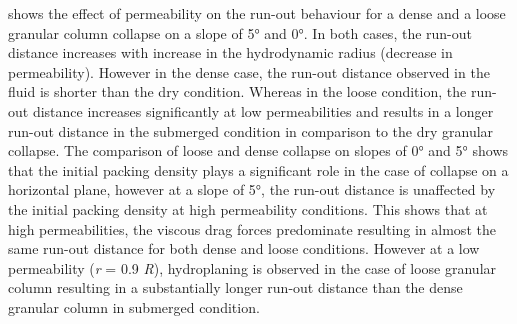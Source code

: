 \documentclass[12pt,twoside]{tuhhproc-en}
\begin{document}
 shows the effect of permeability on the 
run-out behaviour for a dense and a loose granular column collapse on a slope 
of 5\si{\degree} and 0\si{\degree}. In both cases, the run-out distance 
increases with increase in the hydrodynamic radius (decrease in permeability). 
However in the dense case, the run-out distance observed in the fluid is 
shorter than the dry condition. Whereas in the loose condition, the run-out 
distance increases significantly at low permeabilities and results in a longer 
run-out distance in the submerged condition in comparison to the dry granular 
collapse. The comparison of loose and dense collapse on slopes of 
0\si{\degree} and 5\si{\degree} shows that the initial packing density plays a 
significant role in the case of collapse on a horizontal plane, however at a 
slope of 5\si{\degree}, the run-out distance is unaffected by the initial 
packing density at high permeability conditions. This shows that at high 
permeabilities, the viscous drag forces predominate resulting in almost the 
same run-out distance for both dense and loose conditions. However at a low 
permeability (\textit{r} = 0.9 \textit{R}), hydroplaning is observed in the 
case of loose 
granular column resulting in a substantially longer run-out distance than the 
dense granular column in submerged condition. 
%
\end{document}
